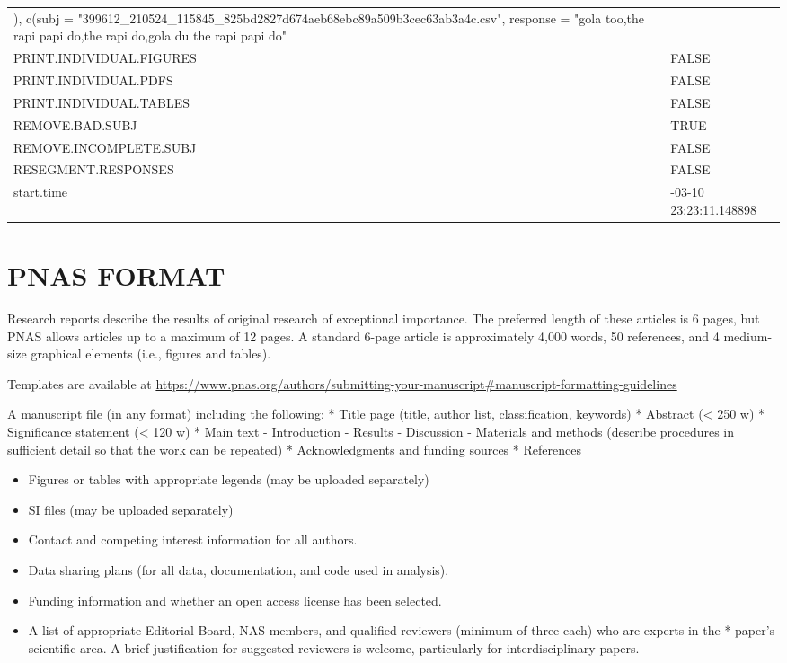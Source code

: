 \documentclass[
]{article}
\providecommand{\tightlist}{%
  \setlength{\itemsep}{0pt}\setlength{\parskip}{0pt}}
\begin{document}
\begin{longtable}[t]{>{\raggedright\arraybackslash}p{20em}>{\raggedright\arraybackslash}p{30em}}
), c(subj = "399612\_210524\_115845\_825bd2827d674aeb68ebc89a509b3cec63ab3a4c.csv", response = "gola too,the rapi papi do,the rapi do,gola du the rapi papi do"\\
\addlinespace
PRINT.INDIVIDUAL.FIGURES & FALSE\\
PRINT.INDIVIDUAL.PDFS & FALSE\\
PRINT.INDIVIDUAL.TABLES & FALSE\\
REMOVE.BAD.SUBJ & TRUE\\
REMOVE.INCOMPLETE.SUBJ & FALSE\\
\addlinespace
RESEGMENT.RESPONSES & FALSE\\
start.time & 2025-03-10 23:23:11.148898\\
\bottomrule
\end{longtable}

\clearpage

\section{PNAS FORMAT}\label{pnas-format}

Research reports describe the results of original research of
exceptional importance. The preferred length of these articles is 6
pages, but PNAS allows articles up to a maximum of 12 pages. A standard
6-page article is approximately 4,000 words, 50 references, and 4
medium-size graphical elements (i.e., figures and tables).

Templates are available at
\url{https://www.pnas.org/authors/submitting-your-manuscript\#manuscript-formatting-guidelines}

A manuscript file (in any format) including the following: * Title page
(title, author list, classification, keywords) * Abstract (\textless{}
250 w) * Significance statement (\textless{} 120 w) * Main text -
Introduction - Results - Discussion - Materials and methods (describe
procedures in sufficient detail so that the work can be repeated) *
Acknowledgments and funding sources * References

\begin{itemize}
\tightlist
\item
  Figures or tables with appropriate legends (may be uploaded
  separately)
\item
  SI files (may be uploaded separately)
\item
  Contact and competing interest information for all authors.
\item
  Data sharing plans (for all data, documentation, and code used in
  analysis).
\item
  Funding information and whether an open access license has been
  selected.
\item
  A list of appropriate Editorial Board, NAS members, and qualified
  reviewers (minimum of three each) who are experts in the * paper's
  scientific area. A brief justification for suggested reviewers is
  welcome, particularly for interdisciplinary papers.
\end{itemize}
\end{document}
